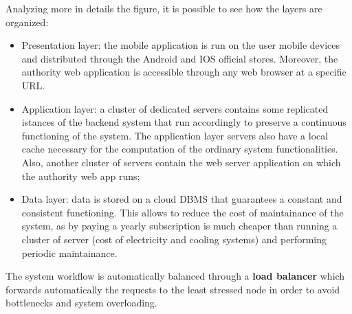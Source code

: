 Analyzing more in details the figure, it is possible to see how the layers are organized:
\begin{itemize}
    \item Presentation layer: the mobile application is run on the user mobile devices and distributed through the Android and IOS official stores. Moreover, the authority web application is accessible through any web browser at a specific URL.
    \item Application layer: a cluster of dedicated servers contains some replicated istances of the backend system that run accordingly to preserve a continuous functioning of the system. The application layer servers also have a local cache necessary for the computation of the ordinary system functionalities. Also, another cluster of servers contain the web server application on which the authority web app runs; 
    \item Data layer: data is stored on a cloud DBMS that guarantees a constant and consistent functioning. This allows to reduce the cost of maintainance of the system, as by paying a yearly subscription is much cheaper than running a cluster of server (cost of electricity and cooling systems) and performing periodic maintainance.
\end{itemize} 
The system workflow is automatically balanced through a \textbf{load balancer} which forwards automatically the requests to the least stressed node in order to avoid bottlenecks and system overloading.